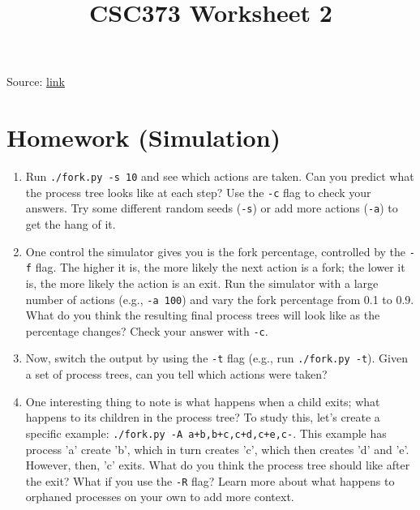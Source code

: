 \documentclass[12pt]{article}
\begin{document}
\title{CSC373 Worksheet 2}
\maketitle

\bigskip

Source: \href{http://pages.cs.wisc.edu/~remzi/OSTEP/cpu-api.pdf}{link}

\bigskip

\section{Homework (Simulation)}

\bigskip

\begin{enumerate}[1.]
    \item Run \texttt{./fork.py -s 10} and see which actions are taken. Can you
    predict what the process tree looks like at each step? Use the \texttt{-c}
    flag to check your answers. Try some different random seeds (\texttt{-s})
    or add more actions (\texttt{-a}) to get the hang of it.

    \item One control the simulator gives you is the fork percentage, controlled by the \texttt{-f} flag. The higher it is, the more likely the next
    action is a fork; the lower it is, the more likely the action is an
    exit. Run the simulator with a large number of actions (e.g., \texttt{-a
    100}) and vary the fork percentage from 0.1 to 0.9. What do you
    think the resulting final process trees will look like as the percentage changes? Check your answer with \texttt{-c}.

    \item Now, switch the output by using the \texttt{-t} flag (e.g., run \texttt{./fork.py
    -t}). Given a set of process trees, can you tell which actions were
    taken?

    \item One interesting thing to note is what happens when a child exits;
    what happens to its children in the process tree? To study this, let’s
    create a specific example: \texttt{./fork.py -A a+b,b+c,c+d,c+e,c-}.
    This example has process ’a’ create ’b’, which in turn creates ’c’,
    which then creates ’d’ and ’e’. However, then, ’c’ exits. What do
    you think the process tree should like after the exit? What if you
    use the \texttt{-R} flag? Learn more about what happens to orphaned processes on your own to add more context.


\end{enumerate}
\end{document}
